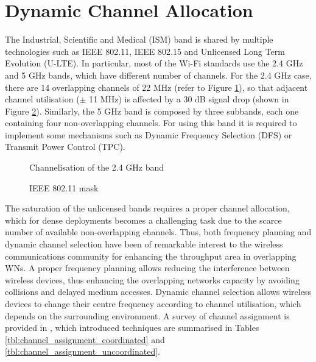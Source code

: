 \documentclass[12pt, a4paper,twoside]{tesi_upf}
\begin{document}
		\section{Dynamic Channel Allocation}		
		\label{section:dca}
			The Industrial, Scientific and Medical (ISM) band is shared by multiple technologies such as IEEE 802.11, IEEE 802.15 and Unlicensed Long Term Evolution (U-LTE). In particular, most of the Wi-Fi standards use the 2.4 GHz	and 5 GHz bands, which have different number of channels. For the 2.4 GHz case, there are 14 overlapping channels of 22 MHz (refer to Figure \ref{fig:channelisation_wifi}), so that adjacent channel utilisation ($\pm$ 11 MHz) is affected by a 30 dB signal drop (shown in Figure \ref{fig:80211ad_mask}). Similarly, the 5 GHz band is composed by three subbands, each one containing four non-overlapping channels. For using this band it is required to implement some mechanisms such as Dynamic Frequency Selection (DFS) or Transmit Power Control (TPC).
			\begin{figure}[h!]
				\centering
				\caption{Channelisation of the 2.4 GHz band}
				\label{fig:channelisation_wifi}
			\end{figure}
			\begin{figure}[h!]
				\centering
				\caption{IEEE 802.11 mask}
				\label{fig:80211ad_mask}
			\end{figure}
			
			The saturation of the unlicensed bands requires a proper channel allocation, which for dense deployments becomes a challenging task due to the scarce number of available non-overlapping channels. Thus, both frequency planning and dynamic channel selection have been of remarkable interest to the wireless communications community for enhancing the throughput area in overlapping WNs. A proper frequency planning allows reducing the interference between wireless devices, thus enhancing the overlapping networks capacity by avoiding collisions and delayed medium accesses. Dynamic channel selection allows wireless devices to change their centre frequency according to channel utilisation, which depends on the surrounding environment. A survey of channel assignment is provided in \cite{chieochan2010channel}, which introduced techniques are summarised in Tables \ref{tbl:channel_assignment_coordinated} and \ref{tbl:channel_assignment_uncoordinated}.
			
\end{document}
